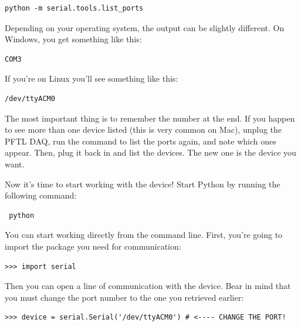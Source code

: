 \begin{verbatim}
python -m serial.tools.list_ports
\end{verbatim}


Depending on your operating system, the output can be slightly different. On Windows, you get something like this:

\begin{verbatim}
COM3
\end{verbatim}

If you're on Linux you'll see something like this:

\begin{verbatim}
/dev/ttyACM0
\end{verbatim}

The most important thing is to remember the number at the end. If you happen to see more than one device listed (this is very common on Mac), unplug the {PFTL DAQ}, run the command to list the ports again, and note which ones appear. Then, plug it back in and list the devices. The new one is the device you want.

Now it's time to start working with the device! Start Python by running the following command:

\begin{verbatim}
 python
\end{verbatim}

You can start working directly from the command line. First, you're going to import the package you need for communication:

\begin{verbatim}
>>> import serial
\end{verbatim}


Then you can open a line of communication with the device. Bear in mind that you must change the port number to the one you retrieved earlier:

\begin{verbatim}
>>> device = serial.Serial('/dev/ttyACM0') # <---- CHANGE THE PORT!
\end{verbatim}

